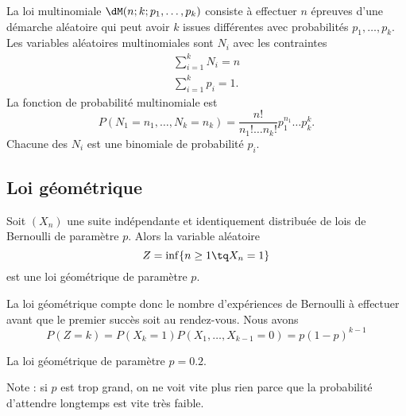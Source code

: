 La loi multinomiale \( \dM(n;k;p_1,\ldots, p_k)\) consiste à effectuer \( n\) épreuves d'une démarche aléatoire qui peut avoir \( k\) issues différentes avec probabilités \( p_1,\ldots, p_k\). Les variables aléatoires multinomiales sont \( N_i\) avec les contraintes
\begin{subequations}
	\begin{align}
		\sum_{i=1}^kN_i=n \\
		\sum_{i=1}^kp_i=1.
	\end{align}
\end{subequations}
La fonction de probabilité multinomiale est
\begin{equation}
	P(N_1=n_1,\ldots, N_k=n_k)=\frac{ n! }{ n_1!\ldots n_k! }p_1^{n_1}\ldots p_k^k.
\end{equation}
Chacune des \( N_i\) est une binomiale de probabilité \( p_i\).

\subsection{Loi géométrique}

Soit \( (X_n)\) une suite indépendante et identiquement distribuée de lois de Bernoulli de paramètre \( p\). Alors la variable aléatoire
\begin{equation}
	Z=\inf\{ n\geq 1\tq X_n=1 \}
\end{equation}
est une loi géométrique de paramètre \( p\).

La loi géométrique compte donc le nombre d'expériences de Bernoulli à effectuer avant que le premier succès soit au rendez-vous. Nous avons
\begin{equation}
	P(Z=k)=P(X_k=1)P(X_1,\ldots,X_{k-1}=0)=p(1-p)^{k-1}
\end{equation}

La loi géométrique de paramètre \( p=0.2\).

\begin{center}
	
\end{center}
Note : si \( p\) est trop grand, on ne voit vite plus rien parce que la probabilité d'attendre longtemps est vite très faible.

